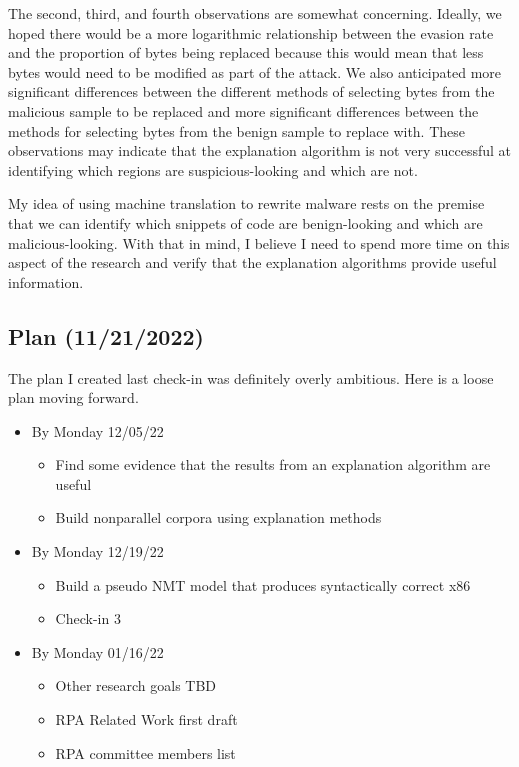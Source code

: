 \documentclass{article}
\begin{document}
The second, third, and fourth observations are somewhat concerning. Ideally, we hoped there would be a more logarithmic relationship between the evasion rate and the proportion of bytes being replaced because this would mean that less bytes would need to be modified as part of the attack. We also anticipated more significant differences between the different methods of selecting bytes from the malicious sample to be replaced and more significant differences between the methods for selecting bytes from the benign sample to replace with. These observations may indicate that the explanation algorithm is not very successful at identifying which regions are suspicious-looking and which are not. 

My idea of using machine translation to rewrite malware rests on the premise that we can identify which snippets of code are benign-looking and which are malicious-looking. With that in mind, I believe I need to spend more time on this aspect of the research and verify that the explanation algorithms provide useful information.

\pagebreak

\subsection*{Plan (11/21/2022)}

The plan I created last check-in was definitely overly ambitious. Here is a loose plan moving forward.

\begin{itemize}
	\item By Monday 12/05/22
	\begin{itemize}
		\item Find some evidence that the results from an explanation algorithm are useful
		\item Build nonparallel corpora using explanation methods
	\end{itemize}
	\item By Monday 12/19/22
	\begin{itemize}
		\item Build a pseudo NMT model that produces syntactically correct x86
		\item Check-in 3
	\end{itemize}
	\item By Monday 01/16/22
	\begin{itemize}
		\item Other research goals TBD
		\item RPA Related Work first draft	
		\item RPA committee members list
	\end{itemize}
\end{itemize}
\end{document}

